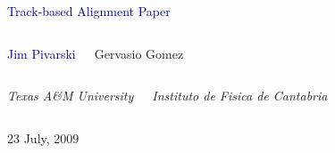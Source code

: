 \documentclass[compress]{beamer}
\begin{document}
\begin{frame}
\vfill
\begin{center}
\textcolor{darkblue}{\Large Track-based Alignment Paper}

\vfill
\begin{columns}
\begin{center}
\large
\textcolor{darkblue}{Jim Pivarski}
\end{center}
\begin{center}
\large
Gervasio Gomez
\end{center}
\end{columns}

\begin{columns}
\begin{center}
\scriptsize
{\it Texas A\&M University}
\end{center}
\begin{center}
\scriptsize
{\it Instituto de Fisica de Cantabria}
\end{center}
\end{columns}

\vfill
23 July, 2009

\end{center}
\end{frame}


\small
\end{document}
